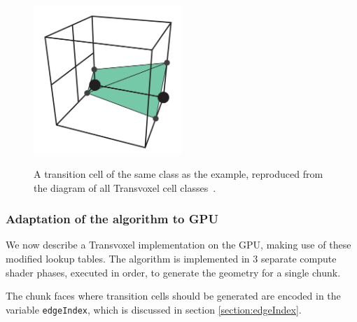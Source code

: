 \documentclass[11pt]{article}
\begin{document}
\begin{figure}
  \caption{A transition cell of the same class as the example, reproduced from the diagram of all Transvoxel cell classes~\cite{lengyel}.}
  \includegraphics[width=0.5\textwidth]{transition_cell_example_case.PNG}
  \label{fig:transition_cell_example_case}
\end{figure}

\subsubsection{Adaptation of the algorithm to GPU}

We now describe a Transvoxel implementation on the GPU, making use of these modified lookup tables. The algorithm is implemented in 3 separate compute shader phases, executed in order, to generate the geometry for a single chunk.

The chunk faces where transition cells should be generated are encoded in the variable \texttt{edgeIndex}, which is discussed in section \ref{section:edgeIndex}.
\end{document}
